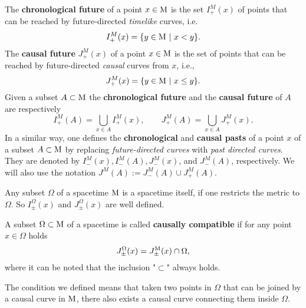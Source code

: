 \begin{definition}
	The \textbf{chronological future} of a point $x\in\mathrm{M}$ is the set $I_+^M(x)$ of points that can be reached by future-directed \textsl{timelike} curves, i.e.
	\[		I_+^M(x)=\{y\in\mM\ |\ x<y\}.	\]
	The \textbf{causal future} $J_+^M(x)$ of a point $x\in\mathrm{M}$ is the set of points that can be reached by future-directed \textsl{causal} curves from $x$, i.e.,
	\[	J_+^M(x)=\{y\in\mathrm{M}\ |\ x\le y\}.	\]
	Given a subset $A\subset \mathrm{M}$ the \textbf{chronological future} and the \textbf{causal future} of $A$ are respectively
	\[	I_+^M(A)=\bigcup_{x\in A}I_+^M(x),\qquad J_+^M(A)=\bigcup_{x\in A}J_+^M(x).	\]
	In a similar way, one defines the \textbf{chronological} and \textbf{causal pasts} of a point $x$ of a subset $A \subset \mathrm{M}$ by replacing \textsl{future-directed curves} with \textsl{past directed curves}. They are denoted by $I_-^M (x), I_-^M (A), J_-^M (x)$, and $J_-^M (A)$, respectively. We will also use the notation $J^M (A) := J_-^M (A) \cup J_+^M (A)$.
\end{definition}
\noindent Any subset $\Omega$ of a spacetime $\mathrm{M}$ is a spacetime itself, if one restricts the metric to $\Omega$. So $I_{\pm}^{\Omega}(x)$ and $J_{\pm}^{\Omega}(x)$ are well defined.
\begin{definition}
	A subset $\Omega\subset\mathrm{M}$ of a spacetime is called \textbf{causally compatible} if for any point $x\in\Omega$ holds
	\[	J_{\pm}^{\Omega}(x)=J_{\pm}^{\mathrm{M}}(x)\cap\Omega,		\]
	where it can be noted that the inclusion "$\subset$" always holds.
\end{definition}

\noindent The condition we defined means that taken two points in $\Omega$ that can be joined by a causal curve in $\mathrm{M}$, there also exists a causal curve connecting them inside $\Omega$.\\

